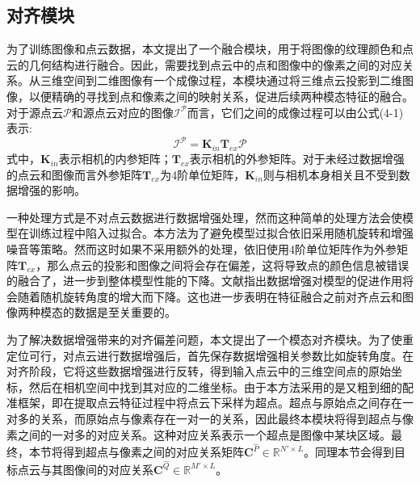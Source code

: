     \subsection{对齐模块}
    为了训练图像和点云数据，本文提出了一个融合模块，用于将图像的纹理颜色和点云的几何结构进行融合。因此，需要找到点云中的点和图像中的像素之间的对应关系。从三维空间到二维图像有一个成像过程，本模块通过将三维点云投影到二维图像，以便精确的寻找到点和像素之间的映射关系，促进后续两种模态特征的融合。对于源点云$\mathcal{P}$和源点云对应的图像$\mathcal{I}^\mathcal{P}$而言，它们之间的成像过程可以由公式(4-1)表示:
    \begin{equation}
        \mathcal{I}^\mathcal{P} = \mathbf{K}_{in} \mathbf{T}_{ex} \mathcal{P}
    \end{equation}
    式中，$\mathbf{K}_{in}$表示相机的内参矩阵；$\mathbf{T}_{ex}$表示相机的外参矩阵。对于未经过数据增强的点云和图像而言外参矩阵$\mathbf{T}_{ex}$为4阶单位矩阵，$\mathbf{K}_{in}$则与相机本身相关且不受到数据增强的影响。\par

    一种处理方式是不对点云数据进行数据增强处理，然而这种简单的处理方法会使模型在训练过程中陷入过拟合。本方法为了避免模型过拟合依旧采用随机旋转和增强噪音等策略。然而这时如果不采用额外的处理，依旧使用4阶单位矩阵作为外参矩阵$\mathbf{T}_{ex}$，那么点云的投影和图像之间将会存在偏差，这将导致点的颜色信息被错误的融合了，进一步到整体模型性能的下降。文献\cite{Deepfusion}指出数据增强对模型的促进作用将会随着随机旋转角度的增大而下降。这也进一步表明在特征融合之前对齐点云和图像两种模态的数据是至关重要的。

    为了解决数据增强带来的对齐偏差问题，本文提出了一个模态对齐模块。为了使重定位可行，对点云进行数据增强后，首先保存数据增强相关参数比如旋转角度。在对齐阶段，它将这些数据增强进行反转，得到输入点云中的三维空间点的原始坐标，然后在相机空间中找到其对应的二维坐标。由于本方法采用的是又粗到细的配准框架，即在提取点云特征过程中将点云下采样为超点。超点与原始点之间存在一对多的关系，而原始点与像素存在一对一的关系，因此最终本模块将得到超点与像素之间的一对多的对应关系。这种对应关系表示一个超点是图像中某块区域。最终，本节将得到超点与像素之间的对应关系矩阵$\mathbf{C}^{\hat{P}} \in \mathbb{R}^{N' \times L}$。同理本节会得到目标点云与其图像间的对应关系$\mathbf{C}^{\hat{Q}} \in \mathbb{R}^{M' \times L}$。



